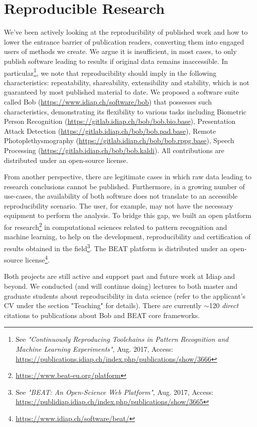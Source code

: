 \documentclass[a4paper,10pt,onecolumn]{article}
\begin{document}
\section{Reproducible Research}

We've been actively looking at the reproducibility of published work and how to
lower the entrance barrier of publication readers, converting them into engaged
users of methods we create.  We argue it is insufficient, in most cases, to
only publish software leading to results if original data remains inaccessible.
In particular\footnote{See \textit{"Continuously Reproducing Toolchains in
Pattern Recognition and Machine Learning Experiments"}, Aug. 2017, Access:
\url{https://publications.idiap.ch/index.php/publications/show/3666}}, we note
that reproducibility should imply in the following characteristics:
repeatability, shareability, extensibility and stability, which is not
guaranteed by most published material to date.  We proposed a software suite
called Bob (\url{https://www.idiap.ch/software/bob}) that possesses such
characteristics, demonstrating its flexibility to various tasks including
Biometric Person Recognition (\url{https://gitlab.idiap.ch/bob/bob.bio.base}),
Presentation Attack Detection (\url{https://gitlab.idiap.ch/bob/bob.pad.base}),
Remote Photoplethysmography (\url{https://gitlab.idiap.ch/bob/bob.rppg.base}),
Speech Processing (\url{https://gitlab.idiap.ch/bob/bob.kaldi}).  All
contributions are distributed under an open-source license.

From another perspective, there are legitimate cases in which raw data leading
to research conclusions cannot be published.  Furthermore, in a growing number
of use-cases, the availability of both software does not translate to an
accessible reproducibility scenario.  The user, for example, may not have the
necessary equipment to perform the analysis.  To bridge this gap, we built an
open platform for research\footnote{\url{https://www.beat-eu.org/platform}} in
computational sciences related to pattern recognition and machine learning, to
help on the development, reproducibility and certification of results obtained
in the field\footnote{See \textit{"BEAT: An Open-Science Web Platform"}, Aug.
2017, Access:
\url{https://publidiap.idiap.ch/index.php/publications/show/3665}}.  The BEAT
platform is distributed under an open-source
license\footnote{\url{https://www.idiap.ch/software/beat/}}.

Both projects are still active and support past and future work at Idiap and
beyond.  We conducted (and will continue doing) lectures to both master and
graduate students about reproducibility in data science (refer to the
applicant's CV under the section "Teaching" for details).  There are currently
$\sim$120 \textit{direct} citations to publications about Bob and BEAT core
frameworks.
\end{document}
